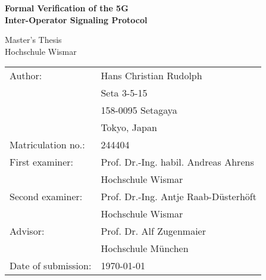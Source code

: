 \begin{titlepage}
\centering

\vspace*{3cm}

{
    \Huge{
        \textbf{Formal Verification of the 5G\\
        \vspace{4mm}
        Inter-Operator Signaling Protocol}
    }
}

\vspace{1cm}

\centering

\LARGE
Master's Thesis\\
Hochschule Wismar

\vspace{2cm}

\vfill
{
    \renewcommand{\arraystretch}{1.1}
    {

    \begin{table}[h!]
    \centering
    \large
    \begin{tabular}{ll}
    Author:             & Hans Christian Rudolph               \\
                        & Seta 3-5-15                          \\
                        & 158-0095 Setagaya                    \\
                        & Tokyo, Japan                         \\
        Matriculation no.:  & 244404                           \vspace{3mm}\\
    First examiner:     & Prof. Dr.-Ing. habil. Andreas Ahrens \\
                        & Hochschule Wismar                    \\
    Second examiner:    & Prof. Dr.-Ing. Antje Raab-Düsterhöft \\
                        & Hochschule Wismar                    \\
    Advisor:            & Prof. Dr. Alf Zugenmaier             \\\vspace{3mm}
                        & Hochschule München                   \\
    Date of submission: & \today
    \end{tabular}
    \end{table}
    }
}

\vspace{2cm}

\end{titlepage}
